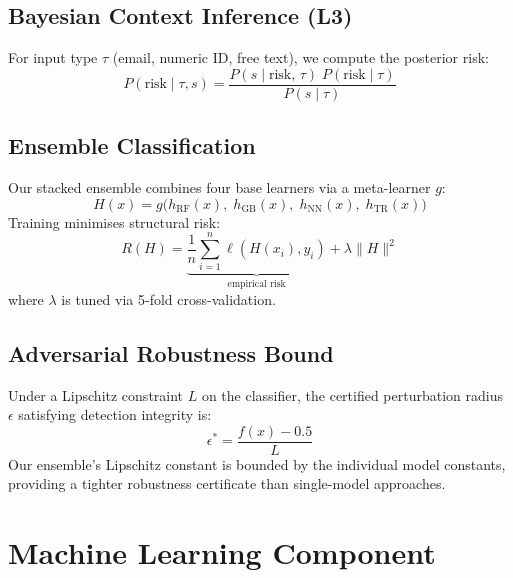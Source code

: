 \documentclass[10pt,twocolumn]{article}
\begin{document}
\subsection{Bayesian Context Inference (L3)}

For input type $\tau$ (email, numeric ID, free text), we compute the
posterior risk:
\begin{equation}
  P(\text{risk} \mid \tau, s) =
  \frac{P(s \mid \text{risk},\, \tau)\; P(\text{risk} \mid \tau)}{P(s \mid \tau)}
\end{equation}

\subsection{Ensemble Classification}

Our stacked ensemble combines four base learners via a meta-learner $g$:
\begin{equation}
  H(x) = g\!\bigl(h_{\text{RF}}(x),\;h_{\text{GB}}(x),\;
                   h_{\text{NN}}(x),\;h_{\text{TR}}(x)\bigr)
\end{equation}
Training minimises structural risk:
\begin{equation}
  R(H) = \underbrace{\frac{1}{n}\sum_{i=1}^{n}\ell(H(x_i),y_i)}_{\text{empirical risk}}
        + \lambda\|H\|^2
\end{equation}
where $\lambda$ is tuned via 5-fold cross-validation.

\subsection{Adversarial Robustness Bound}

Under a Lipschitz constraint $L$ on the classifier, the certified
perturbation radius $\epsilon$ satisfying detection integrity is:
\begin{equation}
  \epsilon^* = \frac{f(x) - 0.5}{L}
\end{equation}
Our ensemble's Lipschitz constant is bounded by the individual model
constants, providing a tighter robustness certificate than single-model
approaches.

\section{Machine Learning Component}
\label{sec:ml}
\end{document}
